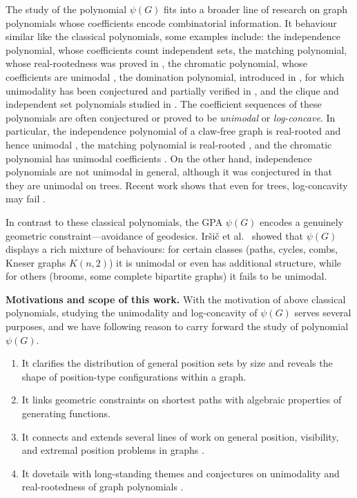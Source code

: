 \documentclass[12pt,twoside]{article}
\begin{document}
The study of the polynomial $\psi(G)$ fits into a broader line of research on graph polynomials whose coefficients encode combinatorial information. It behaviour similar like the classical polynomials, some examples include: the independence polynomial, whose coefficients count independent sets,  the matching polynomial, whose real-rootedness was proved in \cite{11},   the chromatic polynomial, whose coefficients are unimodal \cite{13},   the domination polynomial, introduced in \cite{3}, for which unimodality has been conjectured \cite{3} and partially verified in	\cite{2,5,6,19}, and the clique and independent set polynomials studied in \cite{12}. The coefficient sequences of these polynomials are often conjectured or proved to be \emph{unimodal} or \emph{log-concave}. In particular, the independence polynomial of a claw-free graph is real-rooted and hence unimodal \cite{8}, the
matching polynomial is real-rooted \cite{11}, and the chromatic polynomial has
unimodal coefficients \cite{13}. On the other hand, independence polynomials
are not unimodal in general, although it was conjectured in \cite{1} that they
are unimodal on trees. Recent work shows that even for trees, log-concavity may fail \cite{14}.

In contrast to these classical polynomials, the GPA
$\psi(G)$ encodes a genuinely geometric constraint—avoidance of geodesics.
Ir\v{s}i\v{c} et al.\ \cite{0} showed that $\psi(G)$ displays a rich mixture of
behaviours: for certain classes (paths, cycles, combs, Kneser graphs $K(n,2)$)
it is unimodal or even has additional structure, while for others (brooms,
some complete bipartite graphs) it fails to be unimodal.

\medskip
\noindent\textbf{Motivations and scope of this work.}
With the motivation of above classical polynomials, studying the unimodality and log-concavity of $\psi(G)$ serves several purposes, and we have following reason to carry forward the study of polynomial $\psi(G)$.
\begin{enumerate}
	\item It clarifies the distribution of general position sets by size and
	reveals the shape of position-type configurations within a graph.
	\item It links geometric constraints on shortest paths with algebraic
	properties of generating functions.
	\item It connects and extends several lines of work on general position,
	visibility, and extremal position problems in graphs
	\cite{4,7,9,15,16,20,21,23,24,25,26}.
	\item It dovetails with long-standing themes and conjectures on unimodality
	and real-rootedness of graph polynomials
	\cite{1,2,3,5,6,8,11,12,13,14,19}.
\end{enumerate}
\end{document}
